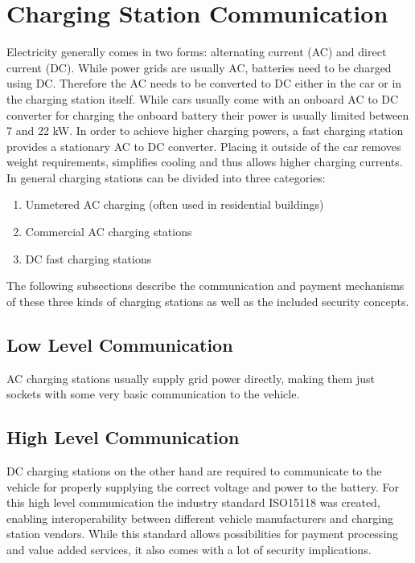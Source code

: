 \documentclass[conference,flushend]{iaria} %
\begin{document}
\section{Charging Station Communication}
Electricity generally comes in two forms: alternating current (AC) and direct current (DC).
While power grids are usually AC, batteries need to be charged using DC.
Therefore the AC needs to be converted to DC either in the car or in the charging station itself.
While cars usually come with an onboard AC to DC converter for charging the onboard battery their power is usually limited between 7 and 22 kW.
In order to achieve higher charging powers, a fast charging station provides a stationary AC to DC converter. Placing it outside of the car removes weight requirements, simplifies cooling and thus allows higher charging currents. \\
In general charging stations can be divided into three categories:
\begin{enumerate}
\item Unmetered AC charging (often used in residential buildings)
\item Commercial AC charging stations
\item DC fast charging stations
\end{enumerate}%
%
The following subsections describe the communication and payment mechanisms of these three kinds of charging stations as well as the included security concepts.

\subsection{Low Level Communication}
AC charging stations usually supply grid power directly, making them just sockets with some very basic communication to the vehicle.

\subsection{High Level Communication}
DC charging stations on the other hand are required to communicate to the vehicle for properly supplying the correct voltage and power to the battery.
For this high level communication the industry standard ISO15118 was created, enabling interoperability between different vehicle manufacturers and charging station vendors.
While this standard allows possibilities for payment processing and value added services, it also comes with a lot of security implications.
\end{document}
